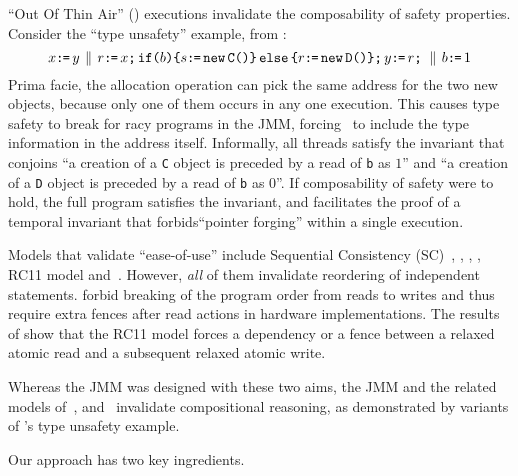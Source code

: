 ``Out Of Thin Air'' (\oota) executions invalidate the 
composability  of safety properties.    Consider the ``type unsafety'' example, from
\citep[Figure 8]{DBLP:journals/toplas/Lochbihler13}:
\begin{equation}
  \label{types}
  x\texttt{:}\mkern-1mu\texttt{=}\, y
  \,\mathbin{\|}\,
  r\texttt{:}\mkern-1mu\texttt{=}\, x \texttt{;}\,\allowbreak \texttt{if}\allowbreak\texttt{(}b\texttt{)} \allowbreak\texttt{\{} s \texttt{:}\mkern-1mu\texttt{=}\, \texttt{new}\, \texttt{C()} \texttt{\}}\,\allowbreak\texttt{else}\allowbreak\,\texttt{\{} r \texttt{:}\mkern-1mu\texttt{=}\, \texttt{new}\, \texttt{D()} \texttt{\}}  \texttt{;}\,\allowbreak y \texttt{:}\mkern-1mu\texttt{=}\, r \texttt{;}\,\allowbreak  
  \,\mathbin{\|}\,
  b \texttt{:}\mkern-1mu\texttt{=}\, 1   
\end{equation}
Prima facie, the allocation operation can pick the same address for the two new objects, because only one of them occurs in any one execution.   This causes type safety to break for racy programs in the JMM, forcing~\citeauthor{DBLP:journals/toplas/Lochbihler13} to include the type information in the address itself.
Informally, all threads satisfy the invariant that conjoins ``a creation of a \texttt{C} object is preceded by a read of \texttt{b} as $1$'' and ``a creation of a \texttt{D} object is preceded by a read of \texttt{b} as $0$''.  If composability of safety were to hold, the full program satisfies the invariant,   and facilitates the proof of a temporal invariant that forbids``pointer forging''  within a single execution.  

Models that validate ``ease-of-use'' include Sequential Consistency (SC)~\citet{Lamport:1979:MMC:1311099.1311750}, \citet{Dolan:2018:BDR:3192366.3192421}, \citet{DBLP:conf/pldi/LahavVKHD17}, \citet{DBLP:conf/lics/JeffreyR16}, RC11 model\cite{DBLP:conf/pldi/LahavVKHD17} and~\citet{BoehmOOTA}.  However, {\em all} of them invalidate reordering of independent statements.  \cite{Dolan:2018:BDR:3192366.3192421,BoehmOOTA,DBLP:conf/lics/JeffreyR16} forbid breaking of the program order from reads to writes and thus require extra fences after read actions in hardware implementations.  The results of \citet{Boehm:2014:OGA:2618128.2618134} show that the RC11 model\cite{DBLP:conf/pldi/LahavVKHD17} forces a dependency or a fence between a relaxed atomic read and a subsequent relaxed atomic write.  


Whereas the JMM was designed with these two aims, the JMM and the related models of~\citet{DBLP:conf/esop/JagadeesanPR10}, \citet{DBLP:conf/popl/KangHLVD17} and~\citet{Chakraborty:2019} invalidate compositional reasoning, as demonstrated by variants of \citeauthor{DBLP:journals/toplas/Lochbihler13}'s type unsafety example.  


Our approach has two key ingredients.  

